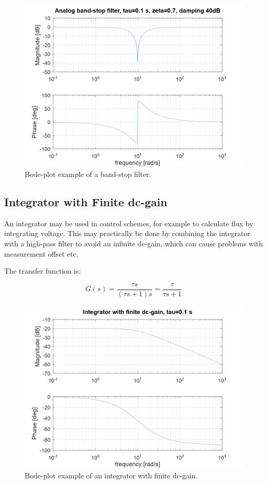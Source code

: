 \documentclass[]{book}
\begin{document}
\begin{figure}
\includegraphics[width=1\linewidth]{images/filters/bsf} \caption{Bode-plot example of a band-stop filter.}\label{fig:unnamed-chunk-6}
\end{figure}

\hypertarget{integrator-with-finite-dc-gain}{%
\subsection{Integrator with Finite dc-gain}\label{integrator-with-finite-dc-gain}}

An integrator may be used in control schemes, for example to calculate flux by integrating voltage. This may practically be done by combining the integrator with a high-pass filter to avoid an infinite dc-gain, which can cause problems with measurement offset etc.

The transfer function is:

\[
G(s) =  \frac{\tau s}{(\tau s + 1)s} = \frac{\tau}{\tau s + 1}
\label{eq:int1}
\]

\begin{figure}
\includegraphics[width=1\linewidth]{images/filters/integrator} \caption{Bode-plot example of an integrator with finite dc-gain.}\label{fig:unnamed-chunk-7}
\end{figure}
\end{document}
